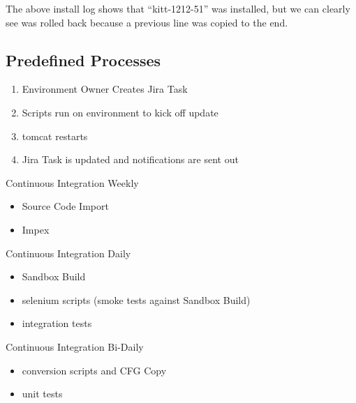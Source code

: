\documentclass[12pt,notitlepage]{article}
\begin{document}
The above install log shows that ``kitt-1212-51'' was installed, but we can clearly see was 
rolled back because a previous line was copied to the end.

\subsection{Predefined Processes}

\begin{enumerate}
\item Environment Owner Creates Jira Task
\item Scripts run on environment to kick off update
\item tomcat restarts
\item Jira Task is updated and notifications are sent out
\end{enumerate}

Continuous Integration Weekly
\begin{itemize}
  \item Source Code Import
  \item Impex
\end{itemize}

Continuous Integration Daily
\begin{itemize}
  \item Sandbox Build
  \item selenium scripts (smoke tests against Sandbox Build)
  \item integration tests
\end{itemize}

Continuous Integration Bi-Daily
\begin{itemize}
  \item conversion scripts and CFG Copy
  \item unit tests  
\end{itemize}


\end{document}
